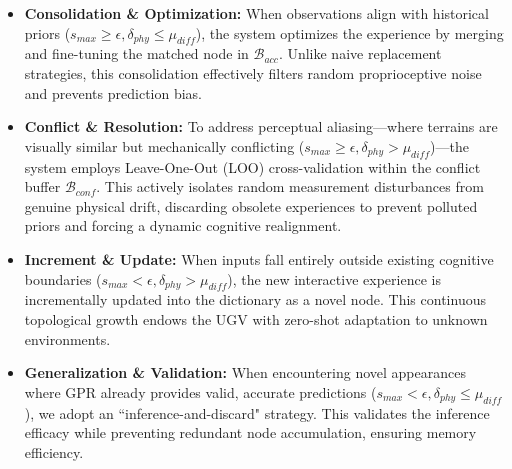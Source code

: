 \documentclass[letterpaper, 10 pt, conference]{ieeeconf}  %
\begin{document}
\begin{itemize}
\item \textbf{Consolidation \& Optimization:} When observations align with historical priors ($s_{max} \ge \epsilon, \delta_{phy} \le \mu_{diff}$), the system optimizes the experience by merging and fine-tuning the matched node in $\mathcal{B}_{acc}$. Unlike naive replacement strategies, this consolidation effectively filters random proprioceptive noise and prevents prediction bias.
\item \textbf{Conflict \& Resolution:} To address perceptual aliasing—where terrains are visually similar but mechanically conflicting ($s_{max} \ge \epsilon, \delta_{phy} > \mu_{diff}$)—the system employs Leave-One-Out (LOO) cross-validation within the conflict buffer $\mathcal{B}_{conf}$. This actively isolates random measurement disturbances from genuine physical drift, discarding obsolete experiences to prevent polluted priors and forcing a dynamic cognitive realignment.
\item \textbf{Increment \& Update:} When inputs fall entirely outside existing cognitive boundaries ($s_{max} < \epsilon, \delta_{phy} > \mu_{diff}$), the new interactive experience is incrementally updated into the dictionary as a novel node. This continuous topological growth endows the UGV with zero-shot adaptation to unknown environments.
\item \textbf{Generalization \& Validation:} When encountering novel appearances where GPR already provides valid, accurate predictions ($s_{max} < \epsilon, \delta_{phy} \le \mu_{diff}$), we adopt an ``inference-and-discard" strategy. This validates the inference efficacy while preventing redundant node accumulation, ensuring memory efficiency.
\end{itemize}
\end{document}
